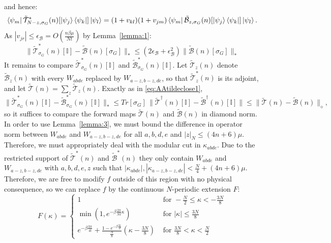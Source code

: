 \documentclass[aps,floatfix,10pt,amssymb,amsfont,amsmath,superscriptaddress,float,nofootinbib,longbibliography,nobalancelastpage,twocolumn]{revtex4-2}
\begin{document}
and hence:
\begin{equation}
    \bra{\psi_m}\tilde{\mathcal{T}}^*_{N -z,\sigma_G}(n)[\ket{\psi_j}\bra{\psi_k}]\ket{\psi_l}
    =(1+v_{kl})(1+v_{jm})\bra{\psi_m}\tilde{\mathcal{B}}_{z,\sigma_G}(n)[\ket{\psi_j}\bra{\psi_k}]\ket{\psi_l}.
\end{equation}
As $|v_{jr}| \leq \epsilon_{\mathcal{B}} = O(\frac{n\beta \mu}{Nt})$ by Lemma~\ref{lemma:1}:
\begin{equation}
    \|\tilde{\mathcal{T}}^*_{\sigma_G}(n)[\mathbb{I}] - \tilde{\mathcal{B}}(n)[\sigma_G]\|_* \leq (2\epsilon_{\mathcal{B}} + \epsilon_{\mathcal{B}}^2)\|\tilde{\mathcal{B}}(n)[\sigma_G]\|_*
    \label{eq:Boutput}
\end{equation}
It remains to compare $\tilde{\mathcal{T}}^*_{\sigma_G}(n)[\mathbb{I}]$ and $\tilde{\mathcal{B}}^*_{\sigma_G}(n)[\mathbb{I}]$. Let $\tilde{\mathcal{T}}_z(n)$ denote $\tilde{\mathcal{B}}_z(n)$ with every $W_{abde}$ replaced by $W_{a-z,b-z,de}$, so that $\tilde{\mathcal{T}}^*_z(n)$ is its adjoint, and let $\tilde{\mathcal{T}}(n)=\sum_z\tilde{\mathcal{T}}_z(n)$. Exactly as in \eqref{eq:AAtildeclose1},
\begin{equation}
    \|\tilde{\mathcal{T}}^*_{\sigma_G}(n)[\mathbb{I}]-\tilde{\mathcal{B}}^*_{\sigma_G}(n)[\mathbb{I}]\|_*\leq Tr[\sigma_G]\,\|\tilde{\mathcal{T}}^{\dagger}(n)[\mathbb{I}]-\tilde{\mathcal{B}}^{\dagger}(n)[\mathbb{I}]\|\leq\|\tilde{\mathcal{T}}(n)-\tilde{\mathcal{B}}(n)\|_{\diamond},
    \label{eq:TBduality}
\end{equation}
so it suffices to compare the forward maps $\tilde{\mathcal{T}}(n)$ and $\tilde{\mathcal{B}}(n)$ in diamond norm. In order to use Lemma~\ref{lemma:3}, we must bound the difference in operator norm between $W_{abde}$ and $W_{a-z,b-z,de}$ for all $a,b,d,e$ and $|z|_{N} \leq (4n+6)\mu$. Therefore, we must appropriately deal with the modular cut in $\kappa_{abde}$. Due to the restricted support of $\tilde{\mathcal{T}}^*(n)$ and $\tilde{\mathcal{B}}^*(n)$ they only contain $W_{abde}$ and $W_{a-z,b-z,de}$ with $a,b,d,e, z$ such that $|\kappa_{abde}|,|\kappa_{a-z,b-z,de}| < \frac{N}{4}+(4n+6)\mu$. Therefore, we are free to modify $f$ outside of this region with no physical consequence, so we can replace $f$ by the continuous $N$-periodic extension $F$:
\begin{equation}
    F(\kappa) = \begin{cases}1& \text{ for }  -\frac{N}{2} \leq \kappa <  - \frac{3N}{8}\\
        \min(1,e^{-\beta \frac{2\pi}{Nt} \kappa}) & \text{ for } |\kappa|\leq \frac{3N}{8}\\
        e^{-\beta\frac{3\pi}{4t}} + \frac{1- e^{-\beta\frac{3\pi}{4t}}}{\frac{N}{8}}(\kappa -  \frac{3N}{8}) & \text{ for }  \frac{3N}{8} < \kappa <  \frac{N}{2}
    \end{cases}
\end{equation}
\end{document}
